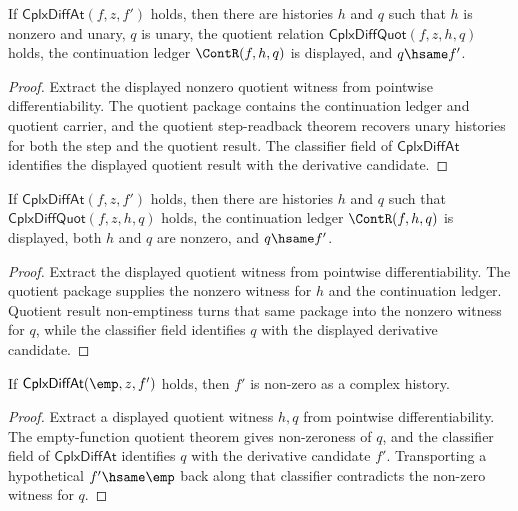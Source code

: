 \begin{theorem}
\label{thm:cplx-diff-at-witness-nonzero-unary-step}
If \(\mathsf{CplxDiffAt}(f,z,f')\) holds, then there are histories \(h\) and
\(q\) such that \(h\) is nonzero and unary, \(q\) is unary, the quotient
relation \(\mathsf{CplxDiffQuot}(f,z,h,q)\) holds, the continuation ledger
\(\ContR(f,h,q)\) is displayed, and \(q\hsame f'\).
\end{theorem}
\begin{proof}
Extract the displayed nonzero quotient witness from pointwise differentiability.
The quotient package contains the continuation ledger and quotient carrier, and
the quotient step-readback theorem recovers unary histories for both the step
and the quotient result. The classifier field of \(\mathsf{CplxDiffAt}\)
identifies the displayed quotient result with the derivative candidate.
\end{proof}

\begin{theorem}
\label{thm:cplx-diff-at-witness-nonzero-result}
If \(\mathsf{CplxDiffAt}(f,z,f')\) holds, then there are histories \(h\) and
\(q\) such that \(\mathsf{CplxDiffQuot}(f,z,h,q)\) holds, the continuation
ledger \(\ContR(f,h,q)\) is displayed, both \(h\) and \(q\) are nonzero, and
\(q\hsame f'\).
\end{theorem}
\begin{proof}
Extract the displayed quotient witness from pointwise differentiability. The
quotient package supplies the nonzero witness for \(h\) and the continuation
ledger. Quotient result non-emptiness turns that same package into the nonzero
witness for \(q\), while the classifier field identifies \(q\) with the
displayed derivative candidate.
\end{proof}

\begin{theorem}
\label{thm:cplx-diff-at-empty-function-derivative-nonzero}
If \(\mathsf{CplxDiffAt}(\emp,z,f')\) holds, then \(f'\) is non-zero as a
complex history.
\end{theorem}
\begin{proof}
Extract a displayed quotient witness \(h,q\) from pointwise differentiability.
The empty-function quotient theorem gives non-zeroness of \(q\), and the
classifier field of \(\mathsf{CplxDiffAt}\) identifies \(q\) with the derivative
candidate \(f'\). Transporting a hypothetical \(f'\hsame\emp\) back along that
classifier contradicts the non-zero witness for \(q\).
\end{proof}

